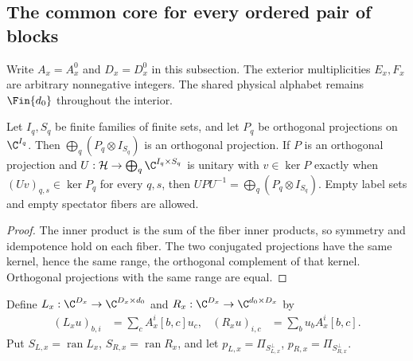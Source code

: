
\subsection{The common core for every ordered pair of blocks}
\label{sec:mpo_joint_core_hamiltonian}

Write $A_x=A_x^0$ and $D_x=D_x^0$ in this subsection. The exterior
multiplicities $E_x,F_x$ are arbitrary nonnegative integers. The shared
physical alphabet remains $\Fin{d_0}$ throughout the interior.

\begin{lemma}
    \label{thm:mpo_dependent_orthogonal_projections}
    \leanok
    Let $I_q,S_q$ be finite families of finite sets, and let $P_q$ be
    orthogonal projections on $\C^{I_q}$. Then
    $\bigoplus_q(P_q\otimes I_{S_q})$ is an orthogonal projection.
    If $P$ is an orthogonal projection and
    $U:\mathcal H\to\bigoplus_q\C^{I_q\times S_q}$ is unitary with
    $v\in\ker P$ exactly when $(Uv)_{q,s}\in\ker P_q$ for every $q,s$,
    then $UPU^{-1}=\bigoplus_q(P_q\otimes I_{S_q})$.
    Empty label sets and empty spectator fibers are allowed.
\end{lemma}
\begin{proof}
    \leanok
    The inner product is the sum of the fiber inner products, so symmetry
    and idempotence hold on each fiber. The two conjugated projections
    have the same kernel, hence the same range, the orthogonal complement
    of that kernel. Orthogonal projections with the same range are equal.
\end{proof}

\begin{definition}
    \label{def:mpo_original_boundary_cores}
    \leanok
    Define $L_x:\C^{D_x}\to\C^{D_x\times d_0}$ and
    $R_x:\C^{D_x}\to\C^{d_0\times D_x}$ by
    \begin{align}
        (L_xu)_{b,i} & =\sum_c A_x^i[b,c]u_c,  &
        (R_xu)_{i,c} & =\sum_b u_b A_x^i[b,c].
    \end{align}
    Put $S_{L,x}=\operatorname{ran}L_x$,
    $S_{R,x}=\operatorname{ran}R_x$, and let
    $p_{L,x}=\Pi_{S_{L,x}^{\perp}}$,
    $p_{R,x}=\Pi_{S_{R,x}^{\perp}}$.
\end{definition}

